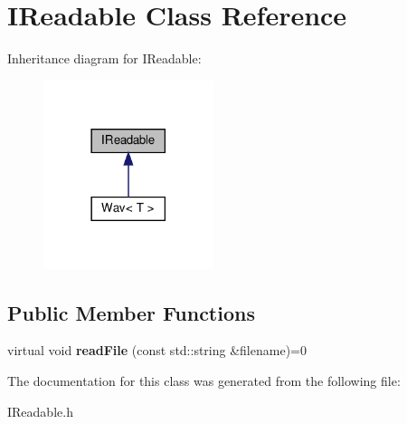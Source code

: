 \hypertarget{classIReadable}{}\section{I\+Readable Class Reference}
\label{classIReadable}


Inheritance diagram for I\+Readable\+:
\nopagebreak
\begin{figure}[H]
\begin{center}
\leavevmode
\includegraphics[width=141pt]{d9/d24/classIReadable__inherit__graph}
\end{center}
\end{figure}
\subsection*{Public Member Functions}
\begin{DoxyCompactItemize}
\item 
\mbox{\label{classIReadable_a0ed44957150b8cd8becce0f929547b8b}} 
virtual void {\bfseries read\+File} (const std\+::string \&filename)=0
\end{DoxyCompactItemize}


The documentation for this class was generated from the following file\+:\begin{DoxyCompactItemize}
\item 
I\+Readable.\+h\end{DoxyCompactItemize}
